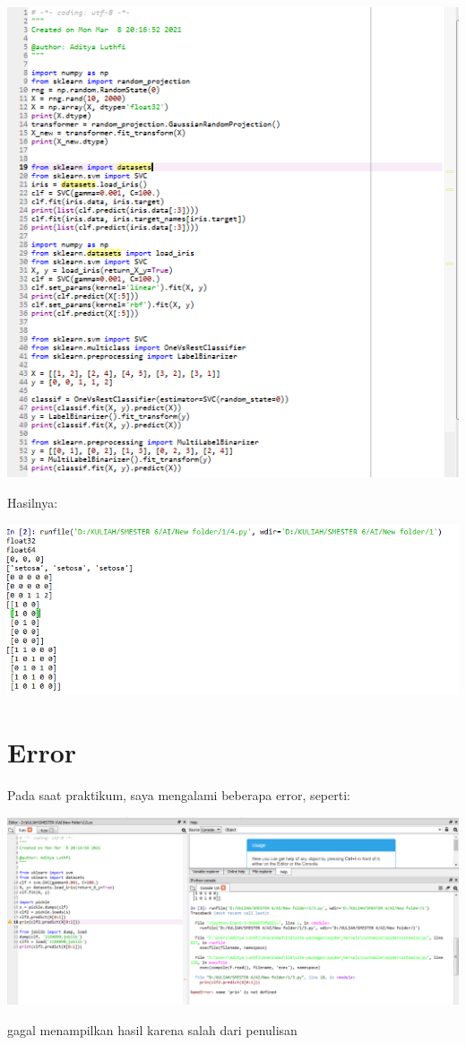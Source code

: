 \documentclass{article}
\begin{document}
\begin{center}
    \includegraphics[width=.8\textwidth]{figures/1184090/chapter1/8.PNG}
\end{center}

Hasilnya:
\begin{center}
    \includegraphics[width=.8\textwidth]{figures/1184090/chapter1/9.PNG}
\end{center}





\section{Error}
Pada saat praktikum, saya mengalami beberapa error, seperti:
\begin{center}
    \includegraphics[width=.8\textwidth]{figures/1184090/chapter1/10.PNG}
\end{center}
gagal menampilkan hasil karena salah dari penulisan
\end{document}
